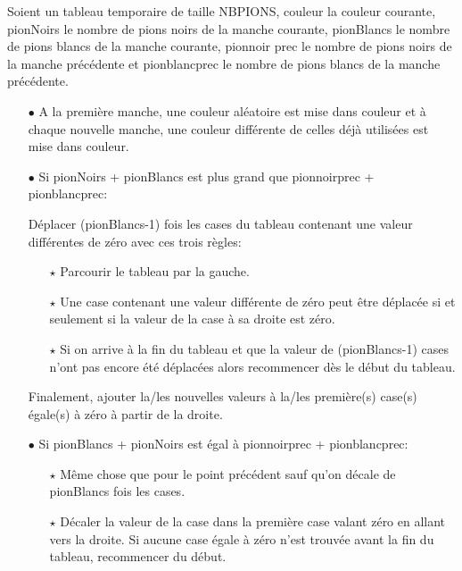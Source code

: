 \documentclass[a4paper, 11pt, oneside]{article}
\begin{document}
Soient un tableau temporaire de taille NB\textunderscore PIONS, couleur la couleur courante, pionNoirs le nombre de pions noirs de la manche courante, pionBlancs le nombre de pions blancs de la manche courante, pion\textunderscore noir \textunderscore prec le nombre de pions noirs de la manche précédente et pion\textunderscore blanc\textunderscore prec le nombre de pions blancs de la manche précédente.

\begin{itemize}
    \item[$\bullet$] A la première manche, une couleur aléatoire est mise dans couleur et à chaque nouvelle manche, une couleur différente de celles déjà utilisées est mise dans couleur.
    \item[$\bullet$] Si pionNoirs + pionBlancs est plus grand que pion\textunderscore noir\textunderscore prec + pion\textunderscore blanc\textunderscore prec:
    \item[]Déplacer (pionBlancs-1) fois les cases du tableau contenant une valeur différentes de zéro avec ces trois règles:
    \begin{itemize}
        \item[$\star$] Parcourir le tableau par la gauche.
        \item[$\star$] Une case contenant une valeur différente de zéro peut être déplacée si et seulement si la valeur de la case à sa droite est zéro.
        \item[$\star$] Si on arrive à la fin du tableau et que la valeur de (pionBlancs-1) cases n'ont pas encore été déplacées alors recommencer dès le début du tableau.
    \end{itemize}
    \item[] Finalement, ajouter la/les nouvelles valeurs à la/les première(s) case(s) égale(s) à zéro à partir de la droite.
    \item[$\bullet$] Si pionBlancs + pionNoirs est égal à pion\textunderscore noir\textunderscore prec + pion\textunderscore blanc\textunderscore prec:
    \begin{itemize}
        \item[$\star$] Même chose que pour le point précédent sauf qu'on décale de pionBlancs fois les cases.
        \item[$\star$] Décaler la valeur de la case dans la première case valant zéro en allant vers la droite. Si aucune case égale à zéro n'est trouvée avant la fin du tableau, recommencer du début.
    \end{itemize}
\end{itemize}
\end{document}
